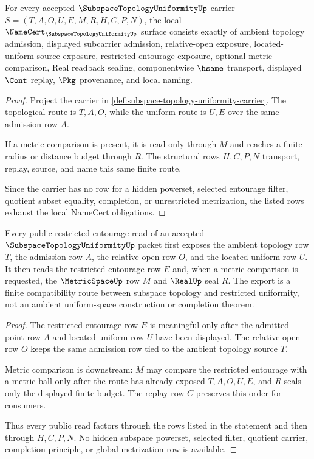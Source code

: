 \begin{theorem}
\label{thm:subspace-topology-uniformity-namecert-obligations}
For every accepted $\SubspaceTopologyUniformityUp$ carrier $S=(T,A,O,U,E,M,R,H,C,P,N)$, the local $\NameCert_{\SubspaceTopologyUniformityUp}$ surface consists exactly of ambient topology admission, displayed subcarrier admission, relative-open exposure, located-uniform source exposure, restricted-entourage exposure, optional metric comparison, Real readback sealing, componentwise $\hsame$ transport, displayed $\Cont$ replay, $\Pkg$ provenance, and local naming.
\end{theorem}
\begin{proof}
Project the carrier in \autoref{def:subspace-topology-uniformity-carrier}. The topological route is $T,A,O$, while the uniform route is $U,E$ over the same admission row $A$.

If a metric comparison is present, it is read only through $M$ and reaches a finite radius or distance budget through $R$. The structural rows $H,C,P,N$ transport, replay, source, and name this same finite route.

Since the carrier has no row for a hidden powerset, selected entourage filter, quotient subset equality, completion, or unrestricted metrization, the listed rows exhaust the local NameCert obligations.
\end{proof}

\begin{theorem}
\label{thm:subspace-topology-uniformity-entourage-restriction-route}
Every public restricted-entourage read of an accepted $\SubspaceTopologyUniformityUp$ packet first exposes the ambient topology row $T$, the admission row $A$, the relative-open row $O$, and the located-uniform row $U$. It then reads the restricted-entourage row $E$ and, when a metric comparison is requested, the $\MetricSpaceUp$ row $M$ and $\RealUp$ seal $R$. The export is a finite compatibility route between subspace topology and restricted uniformity, not an ambient uniform-space construction or completion theorem.
\end{theorem}
\begin{proof}
The restricted-entourage row $E$ is meaningful only after the admitted-point row $A$ and located-uniform row $U$ have been displayed. The relative-open row $O$ keeps the same admission row tied to the ambient topology source $T$.

Metric comparison is downstream: $M$ may compare the restricted entourage with a metric ball only after the route has already exposed $T,A,O,U,E$, and $R$ seals only the displayed finite budget. The replay row $C$ preserves this order for consumers.

Thus every public read factors through the rows listed in the statement and then through $H,C,P,N$. No hidden subspace powerset, selected filter, quotient carrier, completion principle, or global metrization row is available.
\end{proof}


